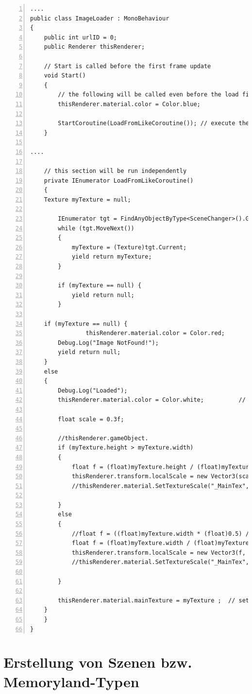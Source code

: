 \begin{lstlisting}[numbers=left,caption={ImageLoader},label={lst:unity-image-loader}]
....
public class ImageLoader : MonoBehaviour
{
    public int urlID = 0;
    public Renderer thisRenderer;

    // Start is called before the first frame update
    void Start()
    {
        // the following will be called even before the load finished
        thisRenderer.material.color = Color.blue;

        StartCoroutine(LoadFromLikeCoroutine()); // execute the section independently
    }

....

    // this section will be run independently
    private IEnumerator LoadFromLikeCoroutine()
    {
	Texture myTexture = null;
	
        IEnumerator tgt = FindAnyObjectByType<SceneChanger>().GetOneTexture(urlID);
        while (tgt.MoveNext()) 
        {
        	myTexture = (Texture)tgt.Current;
        	yield return myTexture;
        }
        
        if (myTexture == null) {
        	yield return null;
        }

	if (myTexture == null) {
            	thisRenderer.material.color = Color.red;          // set red
		Debug.Log("Image NotFound!");
		yield return null;
	}
	else 
	{
		Debug.Log("Loaded");
		thisRenderer.material.color = Color.white;          // set white

		float scale = 0.3f;

		//thisRenderer.gameObject.
		if (myTexture.height > myTexture.width)
		{
			float f = (float)myTexture.height / (float)myTexture.width * scale;
			thisRenderer.transform.localScale = new Vector3(scale, scale, f);
			//thisRenderer.material.SetTextureScale("_MainTex", new Vector2(1f, 0.5f));

		}
		else
		{
			//float f = ((float)myTexture.width * (float)0.5) / ((float)myTexture.height * (float)0.5);
			float f = (float)myTexture.width / (float)myTexture.height * scale;
			thisRenderer.transform.localScale = new Vector3(f, scale, scale);
			//thisRenderer.material.SetTextureScale("_MainTex", new Vector2(0.5f, 1f));

		}

		thisRenderer.material.mainTexture = myTexture ;  // set loaded image
	}
    }
}
\end{lstlisting}




\section{Erstellung von Szenen bzw. Memoryland-Typen}

